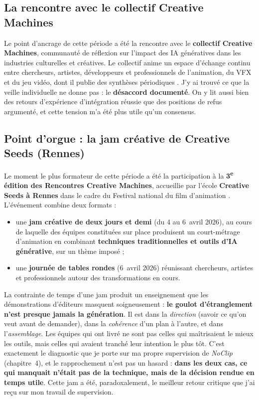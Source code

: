 \documentclass[11pt,a4paper]{report}
\begin{document}
\subsection{La rencontre avec le collectif Creative Machines}
Le point d'ancrage de cette période a été la rencontre avec le \textbf{collectif Creative
Machines}, communauté de réflexion sur l'impact des IA génératives dans les industries
culturelles et créatives. Le collectif anime un espace d'échange continu entre chercheurs,
artistes, développeurs et professionnels de l'animation, du VFX et du jeu vidéo, dont il publie
des synthèses périodiques \autocite{creativemachines2026}. J'y ai trouvé ce que la veille
individuelle ne donne pas : le \textbf{désaccord documenté}. On y lit aussi bien des retours
d'expérience d'intégration réussie que des positions de refus argumenté, et cette tension m'a
été plus utile qu'un consensus.

\subsection{Point d'orgue : la jam créative de Creative Seeds (Rennes)}
Le moment le plus formateur de cette période a été la participation à la
\textbf{3\textsuperscript{e} édition des Rencontres Creative Machines}, accueillie par l'école
\textbf{Creative Seeds à Rennes} dans le cadre du Festival national du film d'animation
\autocite{creativemachines_rencontres2026}. L'événement combine deux formats :

\begin{itemize}
\item une \textbf{jam créative de deux jours et demi} (du 4 au 6~avril 2026), au cours de laquelle
des équipes constituées sur place produisent un court-métrage d'animation en combinant
\textbf{techniques traditionnelles et outils d'IA générative}, sur un thème imposé ;
\item une \textbf{journée de tables rondes} (6~avril 2026) réunissant chercheurs, artistes et
professionnels autour des transformations en cours.
\end{itemize}

\begin{infobox}[title={Ce que la jam m'a appris --- et que la théorie ne m'apprenait pas}]
La contrainte de temps d'une jam produit un enseignement que les démonstrations d'éditeurs
masquent soigneusement : \textbf{le goulot d'étranglement n'est presque jamais la génération}.
Il est dans la \emph{direction} (savoir ce qu'on veut avant de demander), dans la \emph{cohérence}
d'un plan à l'autre, et dans l'\emph{assemblage}. Les équipes qui ont livré ne sont pas celles qui
maîtrisaient le mieux les outils, mais celles qui avaient tranché leur intention le plus tôt. C'est
exactement le diagnostic que je porte sur ma propre supervision de \textit{NoClip} (chapitre~4),
et le rapprochement n'est pas un hasard : \textbf{dans les deux cas, ce qui manquait n'était pas
de la technique, mais de la décision rendue en temps utile}. Cette jam a été, paradoxalement,
le meilleur retour critique que j'ai reçu sur mon travail de supervision.
\end{infobox}
\end{document}
